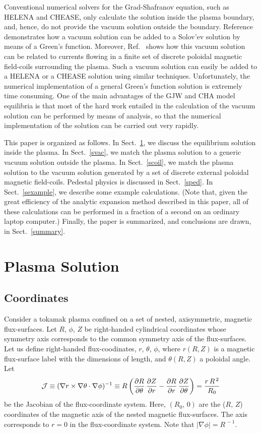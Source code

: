 \documentclass[12pt,prb,aps]{revtex4-1}
\begin{document}
Conventional numerical solvers for the Grad-Shafranov equation, such as HELENA and CHEASE,\cite{helena,chease} only calculate the solution
inside the plasma boundary, and, hence, do not provide the vacuum solution outside the boundary.  Reference   demonstrates how a
vacuum solution can be added to a Solov'ev solution by means of a Green's function.  Moreover, Ref.~ shows how this vacuum solution
can be related to currents flowing in a finite set of discrete poloidal magnetic field-coils surrounding the plasma. Such a vacuum solution can easily be added to a HELENA or a CHEASE solution using similar techniques. Unfortunately, the numerical implementation of a general Green's function solution is extremely time consuming. One of the main advantages of the GJW and CHA model equilibria is that  most of the hard work entailed in  the calculation of the vacuum
solution can be performed by means of analysis, so that the numerical implementation of the solution can be carried out very rapidly. 

This paper is organized as follows. In Sect.~\ref{splasma}, we discuss the equilibrium solution inside the plasma. In
Sect.~\ref{svac}, we match the plasma solution to a generic vacuum solution outside the plasma. In Sect.~\ref{scoil}, we match the plasma solution to
the vacuum solution generated by a set of discrete external poloidal  magnetic field-coils. Pedestal physics is
discussed in Sect.~\ref{sped}. In Sect.~\ref{sexample}, we describe some example calculations. (Note that, given the great efficiency of the analytic
expansion method described in this paper, all of these calculations can be performed in a fraction of a second on an ordinary laptop computer.) 
Finally, the paper is summarized, and conclusions are drawn, in Sect.~\ref{summary}.

\section{Plasma Solution}\label{splasma}
\subsection{Coordinates}
Consider a tokamak plasma confined on a set of nested, axisymmetric, magnetic flux-surfaces. 
Let $R$, $\phi$, $Z$ be  right-handed cylindrical coordinates whose symmetry axis corresponds to the common
symmetry axis of the flux-surfaces. 
Let us define  right-handed flux-coodinates, $r$, $\theta$, $\phi$, where $r(R,Z)$ is a magnetic flux-surface label with the dimensions
of length, and $\theta(R,Z)$ a poloidal angle. Let\,\cite{con0,con,fitz93}
\begin{equation}\label{e1}
{\cal J} \equiv (\nabla r\times\nabla\theta\cdot\nabla\phi)^{-1} \equiv R\left(\frac{\partial R}{\partial\theta}\,\frac{\partial Z}{\partial r} -\frac{\partial R}{\partial r}\,\frac{\partial Z}{\partial \theta}\right)= \frac{r\,R^{\,2}}{R_0}
\end{equation} 
be the Jacobian of the flux-coordinate system. Here, $(R_0,\, 0)$ are the ($R$, $Z$)  coordinates of the magnetic axis of the nested magnetic flux-surfaces.
The axis  corresponds to $r=0$ in the flux-coordinate system.  
Note that $|\nabla\phi|=R^{\,-1}$. 
\end{document}
